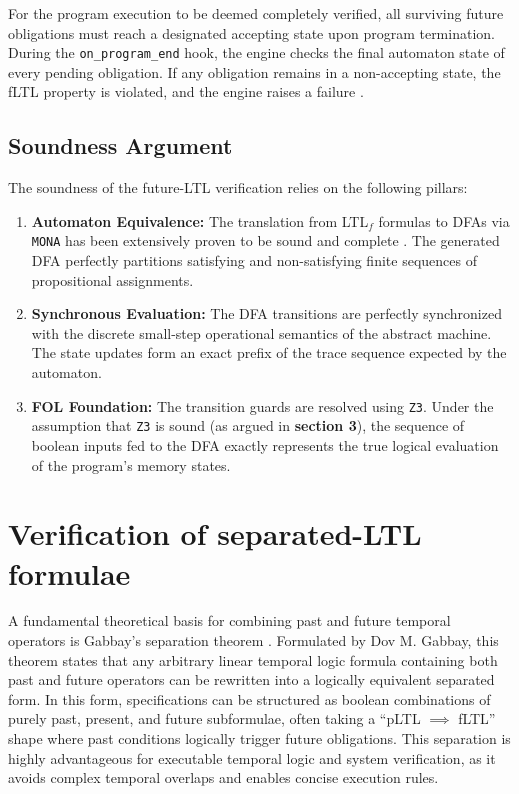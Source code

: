 \documentclass{article}
\begin{document}
For the program execution to be deemed completely verified, all surviving future obligations must reach a designated accepting state upon program termination. During the \texttt{on\_program\_end} hook, the engine checks the final automaton state of every pending obligation. If any obligation remains in a non-accepting state, the fLTL property is violated, and the engine raises a failure %
.

\subsection{Soundness Argument}
The soundness of the future-LTL verification relies on the following pillars:
\begin{enumerate}
    \item \textbf{Automaton Equivalence:} The translation from LTL$_f$ formulas to DFAs via \texttt{MONA} has been extensively proven to be sound and complete \cite{degiacomo2013ltlf, henriksen1995mona}. The generated DFA perfectly partitions satisfying and non-satisfying finite sequences of propositional assignments.
    \item \textbf{Synchronous Evaluation:} The DFA transitions are perfectly synchronized with the discrete small-step operational semantics of the abstract machine. The state updates form an exact prefix of the trace sequence expected by the automaton.
    \item \textbf{FOL Foundation:} The transition guards are resolved using \texttt{Z3}. Under the assumption that \texttt{Z3} is sound (as argued in \textbf{section 3}), the sequence of boolean inputs fed to the DFA exactly represents the true logical evaluation of the program's memory states.
\end{enumerate}

\newpage
\section{Verification of separated-LTL formulae}

A fundamental theoretical basis for combining past and future temporal operators is Gabbay's separation theorem \cite{gabbay1989declarative, gabbay1994temporal}. Formulated by Dov M. Gabbay, this theorem states that any arbitrary linear temporal logic formula containing both past and future operators can be rewritten into a logically equivalent separated form. In this form, specifications can be structured as boolean combinations of purely past, present, and future subformulae, often taking a ``pLTL $\implies$ fLTL'' shape where past conditions logically trigger future obligations. This separation is highly advantageous for executable temporal logic and system verification, as it avoids complex temporal overlaps and enables concise execution rules. 
\end{document}
